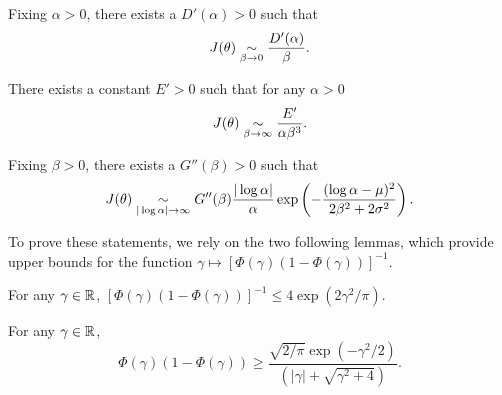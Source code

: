     \begin{prop}\label{prop:jeffb0}
        Fixing $\alpha>0$, there exists a $D'(\alpha)>0$ such that
            \begin{equation}
               J(\theta)\underset{\beta\rightarrow0}{\sim} \frac{D'(\alpha)}{\beta}.
            \end{equation}
    \end{prop}

    \begin{prop}\label{prop:jeffbinf}
        {There exists a constant $E'>0$ such that for any $\alpha>0$}
            \begin{equation}
                J(\theta)\underset{\beta\rightarrow\infty}{\sim}\frac{E'}{\alpha\beta^3}.
            \end{equation}
        \end{prop}

        \newpage
        
        \begin{prop}\label{prop:jeffalph}
            Fixing $\beta>0$, there exists a $G''(\beta)>0$ such that
            \begin{equation}
            J(\theta) \underset{|\log\alpha|\rightarrow\infty}{\sim} G''(\beta)\frac{|\log\alpha|}{\alpha}\exp\left(-\frac{(\log\alpha-\mu)^2}{2\beta^2+2\sigma^2}\right). 
        \end{equation}
        \end{prop}


    To prove these statements, we rely on the two following lemmas, which provide upper bounds for the function $\gamma\mapsto[\Phi(\gamma)(1-\Phi(\gamma))]^{-1}$.



     \begin{lem}\label{lem:phi(1-phi)ineq1}
        For any $\gamma\in\mathbb{R}$, $[\Phi(\gamma)(1-\Phi(\gamma))]^{-1}\leq4\exp\left(2\gamma^2/\pi\right)$.
     \end{lem}

     \begin{lem}\label{lem:phi(1-phi)ineq2} For any $\gamma\in\mathbb{R}$,
        \begin{equation}
        \Phi(\gamma) (1-\Phi(\gamma)) \geq \frac{\sqrt{2/\pi}\exp(-\gamma^2/2)}{  (|\gamma|+\sqrt{\gamma^2+4}) }. 
    \end{equation}
        
    \end{lem}



